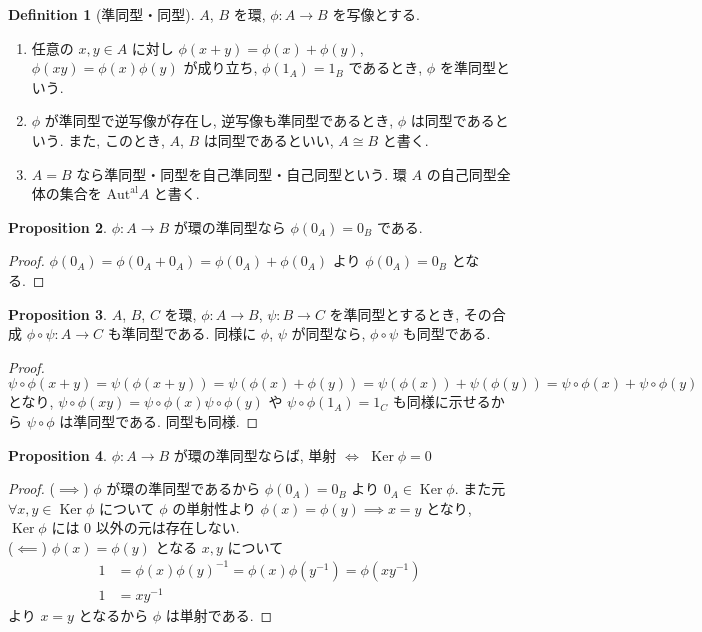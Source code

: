 \documentclass[a4paper,dvipdfmx]{jsarticle}
\DeclareMathOperator{\Ker}{Ker}
\theoremstyle{plain}
\theoremstyle{definition}
\theoremstyle{plain}
\numberwithin{equation}{section}
\numberwithin{theorem}{section}
\numberwithin{definition}{section}
\numberwithin{note}{section}
\theoremstyle{definition}
\newtheorem{dfn}{Definition}[section]
\newtheorem{prop}[dfn]{Proposition}
\begin{document}
\begin{dfn}[準同型・同型]
  $A$, $B$ を環, $\phi:A\to B$ を写像とする.
  \begin{enumerate}
    \item 任意の $x,y\in A$ に対し $\phi(x+y) = \phi(x) + \phi(y)$, $\phi(xy) = \phi(x)\phi(y)$ が成り立ち, $\phi(1_A) = 1_B$ であるとき, $\phi$ を準同型という.
    \item $\phi$ が準同型で逆写像が存在し, 逆写像も準同型であるとき, $\phi$ は同型であるという. また, このとき, $A$, $B$ は同型であるといい, $A\cong B$ と書く.
    \item $A = B$ なら準同型・同型を自己準同型・自己同型という. 環 $A$ の自己同型全体の集合を $\mathrm{Aut}^{\mathrm{al}}A$ と書く.
  \end{enumerate}
\end{dfn}

\begin{prop}
  $\phi:A\to B$ が環の準同型なら $\phi(0_A) = 0_B$ である.
\end{prop}
\begin{proof}
  $\phi(0_A) = \phi(0_A + 0_A) = \phi(0_A) + \phi(0_A)$ より $\phi(0_A) = 0_B$ となる.
\end{proof}

\begin{prop}
  $A$, $B$, $C$ を環, $\phi:A\to B$, $\psi:B\to C$ を準同型とするとき, その合成 $\phi\circ\psi:A\to C$ も準同型である. 同様に $\phi$, $\psi$ が同型なら, $\phi\circ\psi$ も同型である.
\end{prop}
\begin{proof}
  $\psi\circ\phi(x + y) = \psi(\phi(x + y)) = \psi(\phi(x) + \phi(y)) = \psi(\phi(x)) + \psi(\phi(y)) = \psi\circ\phi(x) + \psi\circ\phi(y)$ となり, $\psi\circ\phi(xy) = \psi\circ\phi(x)\psi\circ\phi(y)$ や $\psi\circ\phi(1_A) = 1_C$ も同様に示せるから $\psi\circ\phi$ は準同型である. 同型も同様.
\end{proof}

\begin{prop}
  $\phi:A\to B$ が環の準同型ならば, 単射 $\iff$ $\Ker{\phi} = \qty{0}$
\end{prop}
\begin{proof}
  ($\implies$) $\phi$ が環の準同型であるから $\phi(0_A) = 0_B$ より $0_A\in\Ker\phi$. また元 $\forall x, y \in \Ker\phi$ について $\phi$ の単射性より $\phi(x) = \phi(y) \implies x = y$ となり, $\Ker\phi$ には $0$ 以外の元は存在しない. \\
  ($\impliedby$) $\phi(x) = \phi(y)$ となる $x, y$ について
  \begin{align}
    1 & = \phi(x)\phi(y)^{-1} = \phi(x)\phi(y^{-1}) = \phi(xy^{-1}) \\
    1 & = xy^{-1}
  \end{align}
  より $x = y$ となるから $\phi$ は単射である.
\end{proof}
\end{document}
